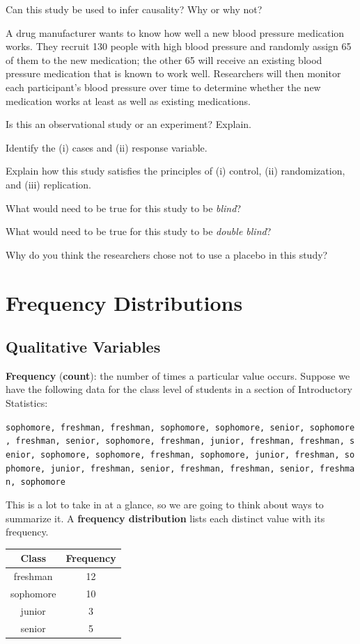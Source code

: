 \documentclass[
]{book}
\begin{document}
Can this study be used to infer causality? Why or why not?

A drug manufacturer wants to know how well a new blood pressure medication works. They recruit 130 people with high blood pressure and randomly assign 65 of them to the new medication; the other 65 will receive an existing blood pressure medication that is known to work well. Researchers will then monitor each participant's blood pressure over time to determine whether the new medication works at least as well as existing medications.

Is this an observational study or an experiment? Explain.

Identify the (i) cases and (ii) response variable.

Explain how this study satisfies the principles of (i) control, (ii) randomization, and (iii) replication.

What would need to be true for this study to be \emph{blind}?

What would need to be true for this study to be \emph{double blind}?

Why do you think the researchers chose not to use a placebo in this study?

\section{Frequency Distributions}\label{frequency-distributions}

\subsection{Qualitative Variables}\label{qualitative-variables}

\textbf{Frequency} (\textbf{count}): the number of times a particular value occurs. Suppose we have the following data for the class level of students in a section of Introductory Statistics:

\texttt{sophomore,\ freshman,\ freshman,\ sophomore,\ sophomore,\ senior,\ sophomore,\ freshman,\ senior,\ sophomore,\ freshman,\ junior,\ freshman,\ freshman,\ senior,\ sophomore,\ sophomore,\ freshman,\ sophomore,\ junior,\ freshman,\ sophomore,\ junior,\ freshman,\ senior,\ freshman,\ freshman,\ senior,\ freshman,\ sophomore}

This is a lot to take in at a glance, so we are going to think about ways to summarize it. A \textbf{frequency distribution} lists each distinct value with its frequency.

\begin{longtable}[]{@{}cc@{}}
\toprule\noalign{}
Class & Frequency \\
\midrule\noalign{}
\endhead
\bottomrule\noalign{}
\endlastfoot
freshman & 12 \\
sophomore & 10 \\
junior & 3 \\
senior & 5 \\
\end{longtable}
\end{document}
